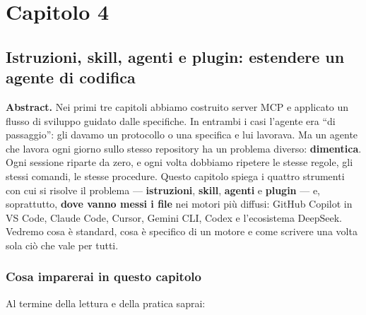 \documentclass[
  italian,
  10pt,
]{book}
\begin{document}
\chapter{Capitolo 4}\label{capitolo-4}

\section{Istruzioni, skill, agenti e plugin: estendere un agente di
codifica}\label{istruzioni-skill-agenti-e-plugin-estendere-un-agente-di-codifica}

\textbf{Abstract.} Nei primi tre capitoli abbiamo costruito server MCP e
applicato un flusso di sviluppo guidato dalle specifiche. In entrambi i
casi l'agente era ``di passaggio'': gli davamo un protocollo o una
specifica e lui lavorava. Ma un agente che lavora ogni giorno sullo
stesso repository ha un problema diverso: \textbf{dimentica}. Ogni
sessione riparte da zero, e ogni volta dobbiamo ripetere le stesse
regole, gli stessi comandi, le stesse procedure. Questo capitolo spiega
i quattro strumenti con cui si risolve il problema ---
\textbf{istruzioni}, \textbf{skill}, \textbf{agenti} e \textbf{plugin}
--- e, soprattutto, \textbf{dove vanno messi i file} nei motori più
diffusi: GitHub Copilot in VS Code, Claude Code, Cursor, Gemini CLI,
Codex e l'ecosistema DeepSeek. Vedremo cosa è standard, cosa è specifico
di un motore e come scrivere una volta sola ciò che vale per tutti.

\subsection{Cosa imparerai in questo
capitolo}\label{cosa-imparerai-in-questo-capitolo-3}

Al termine della lettura e della pratica saprai:
\end{document}
